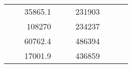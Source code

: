 \begin{table}[H]
\begin{tabular}{|ccrccrccc}
\multicolumn{1}{|c|}{\cellcolor[HTML]{FFFFC7}}                                & \multicolumn{1}{c|}{\cellcolor[HTML]{DAE8FC}}                      & \multicolumn{1}{r|}{\cellcolor[HTML]{DAE8FC}35865.1}   & \multicolumn{1}{c|}{\cellcolor[HTML]{FFFFC7}}                                & \multicolumn{1}{c|}{\cellcolor[HTML]{DAE8FC}}                       & \multicolumn{1}{r|}{\cellcolor[HTML]{DDFDFF}231903}    &                                                                              &                                                                    &                                                        \\ \cline{3-3} \cline{6-6}
\multicolumn{1}{|c|}{\cellcolor[HTML]{FFFFC7}}                                & \multicolumn{1}{c|}{\cellcolor[HTML]{DAE8FC}}                      & \multicolumn{1}{r|}{\cellcolor[HTML]{DDFDFF}108270}    & \multicolumn{1}{c|}{\cellcolor[HTML]{FFFFC7}}                                & \multicolumn{1}{c|}{\cellcolor[HTML]{DAE8FC}}                       & \multicolumn{1}{r|}{\cellcolor[HTML]{DAE8FC}234237}    &                                                                              &                                                                    &                                                        \\ \cline{3-3} \cline{6-6}
\multicolumn{1}{|c|}{\cellcolor[HTML]{FFFFC7}}                                & \multicolumn{1}{c|}{\cellcolor[HTML]{DAE8FC}}                      & \multicolumn{1}{r|}{\cellcolor[HTML]{DAE8FC}60762.4}   & \multicolumn{1}{c|}{\cellcolor[HTML]{FFFFC7}}                                & \multicolumn{1}{c|}{\cellcolor[HTML]{DAE8FC}}                       & \multicolumn{1}{r|}{\cellcolor[HTML]{DDFDFF}486394}    &                                                                              &                                                                    &                                                        \\ \cline{3-3} \cline{6-6}
\multicolumn{1}{|c|}{\cellcolor[HTML]{FFFFC7}}                                & \multicolumn{1}{c|}{\cellcolor[HTML]{DAE8FC}}                      & \multicolumn{1}{r|}{\cellcolor[HTML]{DDFDFF}17001.9}   & \multicolumn{1}{c|}{\cellcolor[HTML]{FFFFC7}}                                & \multicolumn{1}{c|}{\cellcolor[HTML]{DAE8FC}}                       & \multicolumn{1}{r|}{\cellcolor[HTML]{DAE8FC}436859}    &                                                                              &                                                                    &                                                        \\ \cline{3-3} \cline{6-6}

\end{tabular}
\end{table}
